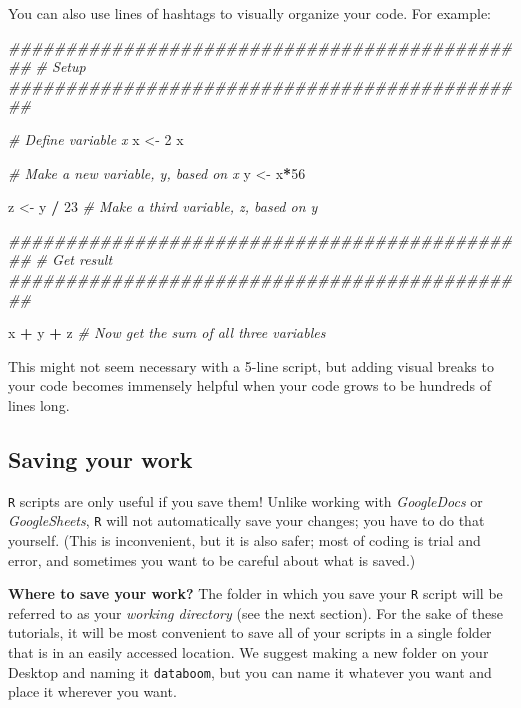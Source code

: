 \documentclass[
]{book}
\newenvironment{Shaded}{\begin{snugshade}}{\end{snugshade}}
\newcommand{\CommentTok}[1]{\textcolor[rgb]{0.56,0.35,0.01}{\textit{#1}}}
\newcommand{\DecValTok}[1]{\textcolor[rgb]{0.00,0.00,0.81}{#1}}
\newcommand{\NormalTok}[1]{#1}
\newcommand{\OperatorTok}[1]{\textcolor[rgb]{0.81,0.36,0.00}{\textbf{#1}}}
\newcommand{\StringTok}[1]{\textcolor[rgb]{0.31,0.60,0.02}{#1}}
\begin{document}
You can also use lines of hashtags to visually organize your code. For example:

\begin{Shaded}
\begin{Highlighting}[]
\CommentTok{##############################################}
\CommentTok{# Setup}
\CommentTok{##############################################}

\CommentTok{# Define variable x}
\NormalTok{x <-}\StringTok{ }\DecValTok{2} 
\NormalTok{x}

\CommentTok{# Make a new variable, y, based on x}
\NormalTok{y <-}\StringTok{ }\NormalTok{x}\OperatorTok{*}\DecValTok{56}

\NormalTok{z <-}\StringTok{ }\NormalTok{y }\OperatorTok{/}\StringTok{ }\DecValTok{23} \CommentTok{# Make a third variable, z, based on y}
 

\CommentTok{##############################################}
\CommentTok{# Get result}
\CommentTok{##############################################}

\NormalTok{x }\OperatorTok{+}\StringTok{ }\NormalTok{y }\OperatorTok{+}\StringTok{ }\NormalTok{z }\CommentTok{# Now get the sum of all three variables}
\end{Highlighting}
\end{Shaded}

This might not seem necessary with a 5-line script, but adding visual breaks to your code becomes immensely helpful when your code grows to be hundreds of lines long.

\hypertarget{saving-your-work}{%
\subsection*{Saving your work}\label{saving-your-work}}

\texttt{R} scripts are only useful if you save them! Unlike working with \emph{GoogleDocs} or \emph{GoogleSheets}, \texttt{R} will not automatically save your changes; you have to do that yourself. (This is inconvenient, but it is also safer; most of coding is trial and error, and sometimes you want to be careful about what is saved.)

\textbf{Where to save your work?} The folder in which you save your \texttt{R} script will be referred to as your \emph{working directory} (see the next section). For the sake of these tutorials, it will be most convenient to save all of your scripts in a single folder that is in an easily accessed location. We suggest making a new folder on your Desktop and naming it \texttt{databoom}, but you can name it whatever you want and place it wherever you want.
\end{document}
